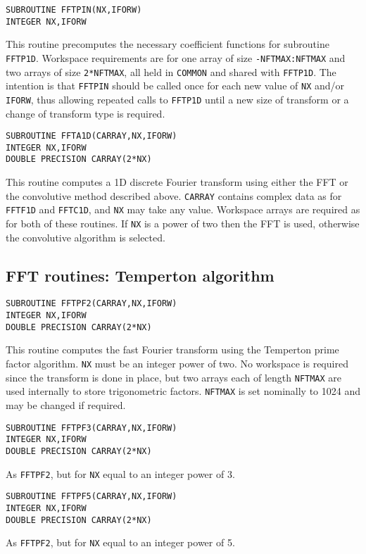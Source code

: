 \documentclass[dvips]{article}
\begin{document}
\begin{verbatim}
SUBROUTINE FFTPIN(NX,IFORW)
INTEGER NX,IFORW
\end{verbatim}
This routine precomputes the necessary coefficient functions for subroutine
{\tt FFTP1D}.
Workspace requirements are for one array of size {\tt -NFTMAX:NFTMAX}
and two arrays of size {\tt 2*NFTMAX}, all
held in {\tt COMMON} and shared with {\tt FFTP1D}.
The intention is that {\tt FFTPIN} should be called once
for each new value of {\tt NX} and/or {\tt IFORW}, thus allowing 
repeated calls to {\tt FFTP1D} until a new size of transform or a change
of transform type is required.

\begin{verbatim}
SUBROUTINE FFTA1D(CARRAY,NX,IFORW)
INTEGER NX,IFORW
DOUBLE PRECISION CARRAY(2*NX)
\end{verbatim}
This routine computes a 1D discrete Fourier transform using either the
FFT or the convolutive method described above.
{\tt CARRAY} contains complex data as for {\tt FFTF1D} and {\tt FFTC1D},
and {\tt NX} may take any value.  Workspace arrays are required as for
both of these routines.  If {\tt NX} is a power of two then the FFT is
used, otherwise the convolutive algorithm is selected.

\subsection*{FFT routines: Temperton algorithm}
\begin{verbatim}
SUBROUTINE FFTPF2(CARRAY,NX,IFORW)
INTEGER NX,IFORW
DOUBLE PRECISION CARRAY(2*NX)
\end{verbatim}
This routine computes the fast Fourier transform using the Temperton
prime factor algorithm.
{\tt NX} must be an integer power of two.  No workspace
is required since the transform is done in place, but two arrays each of
length {\tt NFTMAX} are used internally to store trigonometric factors.
{\tt NFTMAX} is set nominally to 1024 and may be changed if required.

\begin{verbatim}
SUBROUTINE FFTPF3(CARRAY,NX,IFORW)
INTEGER NX,IFORW
DOUBLE PRECISION CARRAY(2*NX)
\end{verbatim}
As {\tt FFTPF2}, but for {\tt NX} equal to an integer power of 3.\\

\begin{verbatim}
SUBROUTINE FFTPF5(CARRAY,NX,IFORW)
INTEGER NX,IFORW
DOUBLE PRECISION CARRAY(2*NX)
\end{verbatim}
As {\tt FFTPF2}, but for {\tt NX} equal to an integer power of 5.\\
\end{document}
